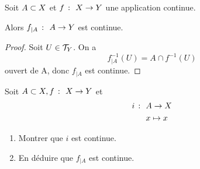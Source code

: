 \begin{proposition}
    Soit \(A\subset X\) et \(f\ \colon\  X \to Y\) une application continue.

    Alors \(f_{\mid A}\ \colon\  A \to Y\) est continue.
\end{proposition}

\begin{proof}
    Soit \(U \in \mathcal{T}_Y\).
    On a 
    \begin{equation*}
        f_{\mid A}^{-1}(U) = A\cap f^{-1}(U)
    \end{equation*}
    ouvert de A, donc \(f_{\mid A}\) est continue.
\end{proof}

\begin{exercice}
    Soit \(A\subset X, f\ \colon\  X \to Y\) et
    \begin{equation*}
        \begin{aligned}
            i\ \colon\  & A \to X\\
            & x \mapsto x
        \end{aligned}
    \end{equation*}
    \begin{enumerate}[label=(\alph*)] %
        \item Montrer que \(i\) est continue.

        \item En déduire que \(f_{\mid A}\) est continue.
    \end{enumerate}
\end{exercice}